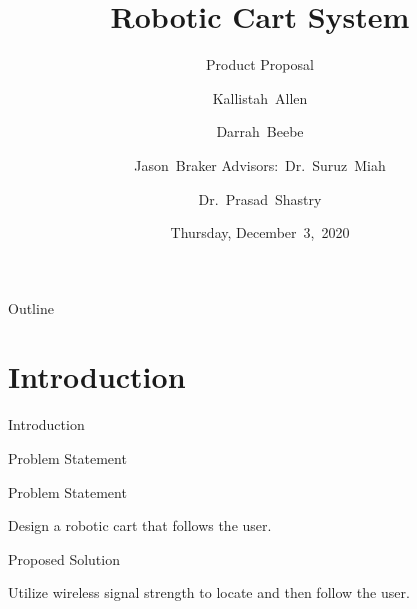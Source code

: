 \documentclass{beamer}
\title[Robotic Cart System (Proposal)]{Robotic Cart System}
\subtitle{Product Proposal}
\author[K.~Allen, D.~Beebe, J.~Braker]{Kallistah~Allen \and Darrah~Beebe \and
Jason~Braker
Advisors:~Dr.~Suruz~Miah \and Dr.~Prasad~Shastry}
\institute[Bradley University] %
{
  Department of Electrical and Computer Engineering\\
  Bradley University\\
  1501 W. Bradley Avenue\\
  Peoria, IL, 61625, USA
}
\date[December~3,~2020]{Thursday, December~3,~2020}
\begin{document}
\begin{frame}
  \titlepage
\end{frame}

\begin{frame}{Outline} 
  \tableofcontents%
\end{frame}

\section{Introduction}

\begin{frame}{Introduction}
\end{frame}

\begin{frame}{Problem Statement}
  \begin{block}{Problem Statement}
    \begin{LARGE}
      Design a robotic cart that follows the user.
    \end{LARGE}
  \end{block}
  \pause
  \begin{block}{Proposed Solution}
    \begin{LARGE}
      Utilize wireless signal strength to locate and then follow the user.
    \end{LARGE}
  \end{block}
\end{frame}
\end{document}

